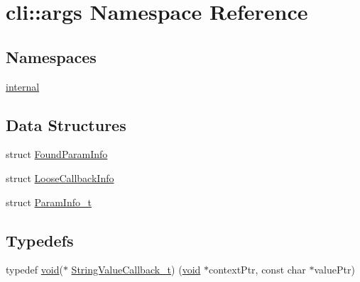 \hypertarget{namespacecli_1_1args}{}\section{cli\+:\+:args Namespace Reference}
\label{namespacecli_1_1args}
\subsection*{Namespaces}
\begin{DoxyCompactItemize}
\item 
 \hyperlink{namespacecli_1_1args_1_1internal}{internal}
\end{DoxyCompactItemize}
\subsection*{Data Structures}
\begin{DoxyCompactItemize}
\item 
struct \hyperlink{structcli_1_1args_1_1_found_param_info}{Found\+Param\+Info}
\item 
struct \hyperlink{structcli_1_1args_1_1_loose_callback_info}{Loose\+Callback\+Info}
\item 
struct \hyperlink{structcli_1_1args_1_1_param_info__t}{Param\+Info\+\_\+t}
\end{DoxyCompactItemize}
\subsection*{Typedefs}
\begin{DoxyCompactItemize}
\item 
typedef \hyperlink{_t_e_m_p_l_a_t_e__cdef_8h_ac9c84fa68bbad002983e35ce3663c686}{void}($\ast$ \hyperlink{namespacecli_1_1args_aa08565ab872ff119b0a21d4bbe1d8e4e}{String\+Value\+Callback\+\_\+t}) (\hyperlink{_t_e_m_p_l_a_t_e__cdef_8h_ac9c84fa68bbad002983e35ce3663c686}{void} $\ast$context\+Ptr, const char $\ast$value\+Ptr)
\end{DoxyCompactItemize}
